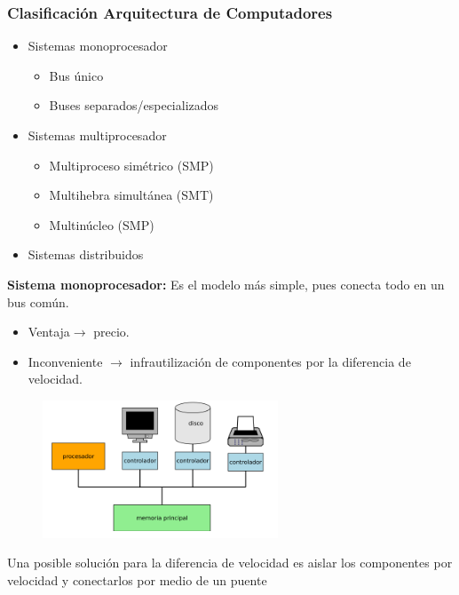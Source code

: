 \documentclass{article}
\begin{document}
\subsubsection{Clasificación Arquitectura de Computadores}
\begin{itemize}
\item Sistemas monoprocesador
	\begin{itemize}
	\item Bus único
	\item Buses separados/especializados
	\end{itemize}
\item Sistemas multiprocesador
	\begin{itemize}
	\item Multiproceso simétrico (SMP)
	\item Multihebra simultánea (SMT)
	\item Multinúcleo (SMP)
	\end{itemize}
	
\item Sistemas distribuidos
\end{itemize}

\textbf{Sistema monoprocesador:} Es el modelo más simple, pues conecta todo en un bus común.
\begin{itemize}
\item Ventaja$\rightarrow$ precio.
\item Inconveniente $\rightarrow$ infrautilización de componentes por la diferencia de velocidad.
\end{itemize}

\begin{figure}[h]
\centering
\includegraphics[scale=1,width=70mm]{monoprocesador.png}
\end{figure}

Una posible solución para la diferencia de velocidad es aislar los componentes por velocidad y conectarlos por medio de un puente
\end{document}
